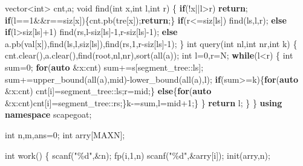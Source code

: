 \documentclass[
]{article}
\newenvironment{Shaded}{}{}
\newcommand{\ControlFlowTok}[1]{\textcolor[rgb]{0.00,0.44,0.13}{\textbf{#1}}}
\newcommand{\DataTypeTok}[1]{\textcolor[rgb]{0.56,0.13,0.00}{#1}}
\newcommand{\DecValTok}[1]{\textcolor[rgb]{0.25,0.63,0.44}{#1}}
\newcommand{\KeywordTok}[1]{\textcolor[rgb]{0.00,0.44,0.13}{\textbf{#1}}}
\newcommand{\NormalTok}[1]{#1}
\newcommand{\SpecialCharTok}[1]{\textcolor[rgb]{0.25,0.44,0.63}{#1}}
\newcommand{\StringTok}[1]{\textcolor[rgb]{0.25,0.44,0.63}{#1}}
\begin{document}
\begin{Shaded}
\begin{Highlighting}[]
\NormalTok{    vector\textless{}}\DataTypeTok{int}\NormalTok{\textgreater{} cnt,a;}
    \DataTypeTok{void}\NormalTok{ find(}\DataTypeTok{int}\NormalTok{ x,}\DataTypeTok{int}\NormalTok{ l,}\DataTypeTok{int}\NormalTok{ r)}
\NormalTok{    \{}
        \ControlFlowTok{if}\NormalTok{(!x||l\textgreater{}r) }\ControlFlowTok{return}\NormalTok{;}
        \ControlFlowTok{if}\NormalTok{(l==}\DecValTok{1}\NormalTok{\&\&r==siz[x])\{cnt.pb(tre[x]);}\ControlFlowTok{return}\NormalTok{;\}}
        \ControlFlowTok{if}\NormalTok{(r\textless{}=siz[ls]) find(ls,l,r);}
        \ControlFlowTok{else} \ControlFlowTok{if}\NormalTok{(l\textgreater{}siz[ls]+}\DecValTok{1}\NormalTok{) find(rs,l{-}siz[ls]{-}}\DecValTok{1}\NormalTok{,r{-}siz[ls]{-}}\DecValTok{1}\NormalTok{);}
        \ControlFlowTok{else}\NormalTok{ a.pb(val[x]),find(ls,l,siz[ls]),find(rs,}\DecValTok{1}\NormalTok{,r{-}siz[ls]{-}}\DecValTok{1}\NormalTok{);}
\NormalTok{    \}}
    \DataTypeTok{int}\NormalTok{ query(}\DataTypeTok{int}\NormalTok{ nl,}\DataTypeTok{int}\NormalTok{ nr,}\DataTypeTok{int}\NormalTok{ k)}
\NormalTok{    \{}
\NormalTok{        cnt.clear(),a.clear(),find(root,nl,nr),sort(all(a));}
        \DataTypeTok{int}\NormalTok{ l=}\DecValTok{0}\NormalTok{,r=N;}
        \ControlFlowTok{while}\NormalTok{(l\textless{}r)}
\NormalTok{        \{}
            \DataTypeTok{int}\NormalTok{ sum=}\DecValTok{0}\NormalTok{;}
            \ControlFlowTok{for}\NormalTok{(}\KeywordTok{auto}\NormalTok{ \&x:cnt) sum+=s[segment\_tree::ls];}
\NormalTok{            sum+=upper\_bound(all(a),mid){-}lower\_bound(all(a),l);}
            \ControlFlowTok{if}\NormalTok{(sum\textgreater{}=k)\{}\ControlFlowTok{for}\NormalTok{(}\KeywordTok{auto}\NormalTok{ \&x:cnt) cnt[i]=segment\_tree::ls;r=mid;\}}
            \ControlFlowTok{else}\NormalTok{\{}\ControlFlowTok{for}\NormalTok{(}\KeywordTok{auto}\NormalTok{ \&x:cnt)cnt[i]=segment\_tree::rs;\}k{-}=sum,l=mid+}\DecValTok{1}\NormalTok{;\}}
\NormalTok{        \}}
        \ControlFlowTok{return}\NormalTok{ l;}
\NormalTok{    \}}
\NormalTok{\}}
\KeywordTok{using} \KeywordTok{namespace}\NormalTok{ scapegoat;}

\DataTypeTok{int}\NormalTok{ n,m,ans=}\DecValTok{0}\NormalTok{;}
\DataTypeTok{int}\NormalTok{ arry[MAXN];}

\DataTypeTok{int}\NormalTok{ work()}
\NormalTok{\{}
\NormalTok{    scanf(}\StringTok{"}\SpecialCharTok{\%d}\StringTok{"}\NormalTok{,\&n);}
\NormalTok{    fp(i,}\DecValTok{1}\NormalTok{,n) scanf(}\StringTok{"}\SpecialCharTok{\%d}\StringTok{"}\NormalTok{,\&arry[i]);}
\NormalTok{    init(arry,n);}


\end{Highlighting}
\end{Shaded}
\end{document}
